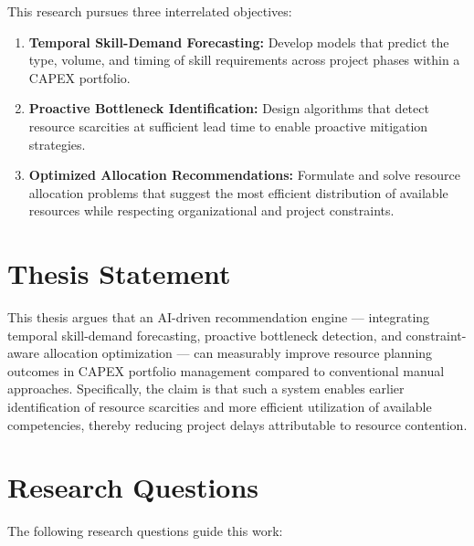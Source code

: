 This research pursues three interrelated objectives:

\begin{enumerate}
  \item \textbf{Temporal Skill-Demand Forecasting:} Develop models that predict the type, volume, and timing of skill requirements across project phases within a CAPEX portfolio.

  \item \textbf{Proactive Bottleneck Identification:} Design algorithms that detect resource scarcities at sufficient lead time to enable proactive mitigation strategies.

  \item \textbf{Optimized Allocation Recommendations:} Formulate and solve resource allocation problems that suggest the most efficient distribution of available resources while respecting organizational and project constraints.
\end{enumerate}

\section{Thesis Statement}
\label{sec:thesis_statement}

This thesis argues that an AI-driven recommendation engine — integrating temporal skill-demand forecasting, proactive bottleneck detection, and constraint-aware allocation optimization — can measurably improve resource planning outcomes in CAPEX portfolio management compared to conventional manual approaches. Specifically, the claim is that such a system enables earlier identification of resource scarcities and more efficient utilization of available competencies, thereby reducing project delays attributable to resource contention.


\section{Research Questions}
\label{sec:research_questions}

The following research questions guide this work:


